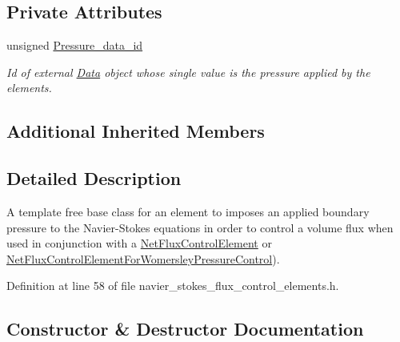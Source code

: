\subsection*{Private Attributes}
\begin{DoxyCompactItemize}
\item 
unsigned \hyperlink{classoomph_1_1TemplateFreeNavierStokesFluxControlElementBase_aa2241fa9932f0e17286c2f8c02811b1a}{Pressure\+\_\+data\+\_\+id}
\begin{DoxyCompactList}\small\item\em Id of external \hyperlink{classoomph_1_1Data}{Data} object whose single value is the pressure applied by the elements. \end{DoxyCompactList}\end{DoxyCompactItemize}
\subsection*{Additional Inherited Members}


\subsection{Detailed Description}
A template free base class for an element to imposes an applied boundary pressure to the Navier-\/\+Stokes equations in order to control a volume flux when used in conjunction with a \hyperlink{classoomph_1_1NetFluxControlElement}{Net\+Flux\+Control\+Element} or \hyperlink{classoomph_1_1NetFluxControlElementForWomersleyPressureControl}{Net\+Flux\+Control\+Element\+For\+Womersley\+Pressure\+Control}). 

Definition at line 58 of file navier\+\_\+stokes\+\_\+flux\+\_\+control\+\_\+elements.\+h.



\subsection{Constructor \& Destructor Documentation}
\mbox{\label{classoomph_1_1TemplateFreeNavierStokesFluxControlElementBase_a40aa0d1bfde79887f6203474478acbb7}} 
